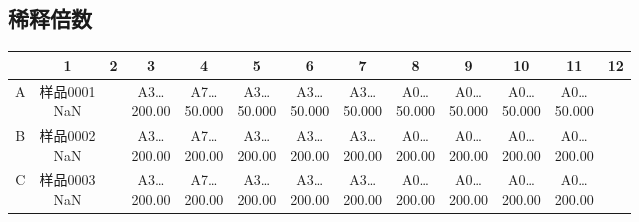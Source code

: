 \documentclass[UTF8,10pt,a4paper,fontset=fandol]{ctexart}
\begin{document}

\subsection*{稀释倍数}

\begin{center}
\scriptsize
\begin{tabular}{c|cccccccccccc}
 & 1 & 2 & 3 & 4 & 5 & 6 & 7 & 8 & 9 & 10 & 11 & 12\\
\hline
A & \shortstack{样品0001\\NaN} & & \shortstack{A3\ldots\\200.00} & \shortstack{A7\ldots\\50.000} & \shortstack{A3\ldots\\50.000} & \shortstack{A3\ldots\\50.000} & \shortstack{A3\ldots\\50.000} & \shortstack{A0\ldots\\50.000} & \shortstack{A0\ldots\\50.000} & \shortstack{A0\ldots\\50.000} & \shortstack{A0\ldots\\50.000} &\\
B & \shortstack{样品0002\\NaN} & & \shortstack{A3\ldots\\200.00} & \shortstack{A7\ldots\\200.00} & \shortstack{A3\ldots\\200.00} & \shortstack{A3\ldots\\200.00} & \shortstack{A3\ldots\\200.00} & \shortstack{A0\ldots\\200.00} & \shortstack{A0\ldots\\200.00} & \shortstack{A0\ldots\\200.00} & \shortstack{A0\ldots\\200.00} &\\
C & \shortstack{样品0003\\NaN} & & \shortstack{A3\ldots\\200.00} & \shortstack{A7\ldots\\200.00} & \shortstack{A3\ldots\\200.00} & \shortstack{A3\ldots\\200.00} & \shortstack{A3\ldots\\200.00} & \shortstack{A0\ldots\\200.00} & \shortstack{A0\ldots\\200.00} & \shortstack{A0\ldots\\200.00} & \shortstack{A0\ldots\\200.00} &\\

\end{tabular}
\end{center}
\end{document}
